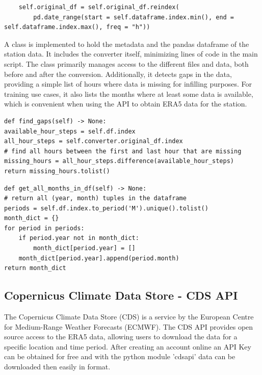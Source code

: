 \begin{lstlisting}
    self.original_df = self.original_df.reindex(
        pd.date_range(start = self.dataframe.index.min(), end = self.dataframe.index.max(), freq = "h"))
\end{lstlisting}

A class  is implemented to hold the metadata and the pandas dataframe of the station data.
It includes the converter itself, minimizing lines of code in the main script.
The class primarily manages access to the different files and data, both before and after the conversion.
Additionally, it detects gaps in the data, providing a simple list of hours where data is missing for infilling purposes.
For training use cases, it also lists the months where at least some data is available, which is convenient when using the API to obtain ERA5 data for the station.


\begin{lstlisting}[caption=Gap Detection in Station Class, label=lst:find_gaps]
def find_gaps(self) -> None:
available_hour_steps = self.df.index
all_hour_steps = self.converter.original_df.index
# find all hours between the first and last hour that are missing
missing_hours = all_hour_steps.difference(available_hour_steps)
return missing_hours.tolist()
\end{lstlisting}

\begin{lstlisting}[caption=Detection of available ranges in Station Class, label=lst:available_ranges]
def get_all_months_in_df(self) -> None:
# return all (year, month) tuples in the dataframe
periods = self.df.index.to_period('M').unique().tolist()
month_dict = {}
for period in periods:
    if period.year not in month_dict:
        month_dict[period.year] = []
    month_dict[period.year].append(period.month)
return month_dict
\end{lstlisting}

\subsection{Copernicus Climate Data Store - CDS API}
\label{sec: cds_api}

The Copernicus Climate Data Store (CDS) is a service by the European Centre for Medium-Range Weather Forecasts (ECMWF).
The CDS API provides open source access to the ERA5 data, allowing users to download the data for a specific location and time period.
After creating an account online an API Key can be obtained for free and with the python module 'cdsapi' data can be downloaded then easily in  format. 

